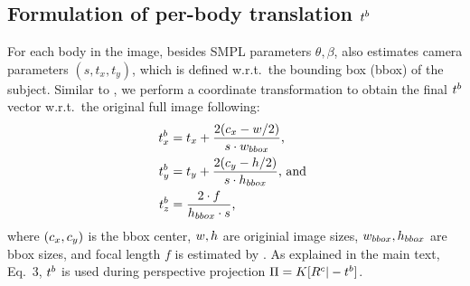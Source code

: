 \documentclass[10pt,twocolumn,letterpaper,usenames,dvipsnames]{article}
\begin{document}
\subsection{Formulation of per-body translation $t^b$}

For each body in the image, besides SMPL parameters $\theta,\beta$, \methodname also estimates camera parameters $(s, t_x, t_y)$, 
which is defined w.r.t.~the bounding box (bbox) of the subject.
Similar to \cite{jiang2020mpshape,kissosECCVW2020}, we perform a coordinate transformation 
to obtain the final $t^b$ vector w.r.t.~the original full image following: 
\begin{equation}
\label{eq:body_transl}
\begin{split}
    t^b_x & = t_x + \frac{2(c_x - w/2)}{s \cdot w_{bbox}} \text{,} \\
    t^b_y & = t_y + \frac{2(c_y - h/2)}{s \cdot h_{bbox}} \text{, and } \\
    t^b_z & = \frac{2 \cdot f}{h_{bbox} \cdot s} \text{,}
\end{split}
\end{equation}
where $(c_x, c_y)$ is the bbox center, $w, h$ are originial image sizes, $w_{bbox}, h_{bbox}$ are bbox sizes, and focal length $f$ is estimated by \camcalib.
As explained in the main text, Eq.~3, $t^b$ is used during perspective projection $\Pi = K[R^c|-t^b]$.
\end{document}
